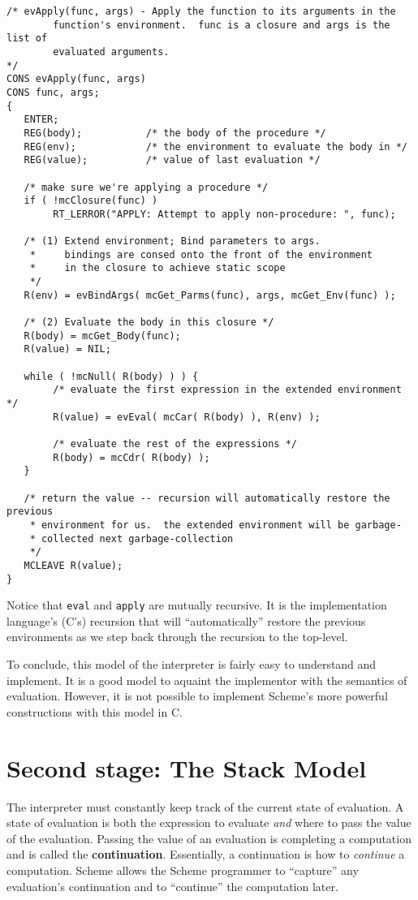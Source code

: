 \begin{verbatim}
/* evApply(func, args) - Apply the function to its arguments in the
        function's environment.  func is a closure and args is the list of
        evaluated arguments.
*/
CONS evApply(func, args)
CONS func, args;
{
   ENTER;
   REG(body);           /* the body of the procedure */
   REG(env);            /* the environment to evaluate the body in */
   REG(value);          /* value of last evaluation */

   /* make sure we're applying a procedure */
   if ( !mcClosure(func) )
        RT_LERROR("APPLY: Attempt to apply non-procedure: ", func);

   /* (1) Extend environment; Bind parameters to args.
    *     bindings are consed onto the front of the environment
    *     in the closure to achieve static scope
    */
   R(env) = evBindArgs( mcGet_Parms(func), args, mcGet_Env(func) );

   /* (2) Evaluate the body in this closure */
   R(body) = mcGet_Body(func);
   R(value) = NIL;

   while ( !mcNull( R(body) ) ) {
        /* evaluate the first expression in the extended environment */
        R(value) = evEval( mcCar( R(body) ), R(env) );

        /* evaluate the rest of the expressions */
        R(body) = mcCdr( R(body) );
   }

   /* return the value -- recursion will automatically restore the previous
    * environment for us.  the extended environment will be garbage-
    * collected next garbage-collection
    */
   MCLEAVE R(value);
}
\end{verbatim}

	Notice that {\tt eval} and {\tt apply} are mutually recursive.  It
is the implementation language's (C's) recursion that will
``automatically'' restore the previous environments as we step back
through the recursion to the top-level.

	To conclude, this model of the interpreter is fairly easy to
understand and implement.  It is a good model to aquaint the implementor
with the semantics of evaluation.  However, it is not possible to
implement Scheme's more powerful constructions with this model in C.

\section{Second stage: The Stack Model}

	The interpreter must constantly keep track of the current state of
evaluation.  A state of evaluation is both the expression to evaluate {\em
and} where to pass the value of the evaluation.  Passing the value of an
evaluation is completing a computation and is called the {\bf
continuation}.  Essentially, a continuation is how to {\em continue} a
computation.  Scheme allows the Scheme programmer to ``capture'' any
evaluation's continuation and to ``continue'' the computation later.


